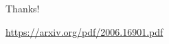 \documentclass[usenames,dvipsnames,svgnames,table]{beamer}
\begin{document}
\begin{frame}
\centering
\huge{Thanks!}

\vspace{1cm}
\centering
\Large{\url{https://arxiv.org/pdf/2006.16901.pdf}}
\end{frame}


\end{document}
